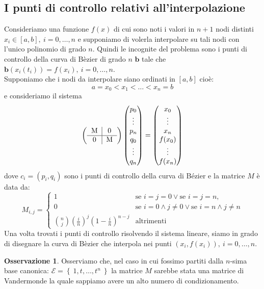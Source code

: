 \documentclass[a4paper,12pt]{report}
\theoremstyle{definition}
\newtheorem{oss}{Osservazione}[chapter]
\begin{document}
\subsection{I punti di controllo relativi all'interpolazione} \label{System}
Consideriamo una funzione $f(x)$ di cui sono noti i valori in $n + 1$ nodi distinti $x_i \in [a,b],\ i = 0, \ldots, n$ e supponiamo di volerla interpolare su tali nodi con l'unico polinomio di grado $n$. Quindi le incognite del problema sono i punti di controllo della curva di Bèzier di grado $n$ $\textbf{b}$ tale che $\textbf{b}(x_i(t_i)) = f(x_i),\ i = 0, \ldots, n$.\\Supponiamo che i nodi da interpolare siano ordinati in $[a,b]$ cioè: $$a = x_0 < x_1 < \ldots < x_n = b$$ e consideriamo il sistema  
$$\left(\begin{matrix}\begin{tabular}{c|c}
M&0\\\hline 0&M
\end{tabular}
\end{matrix}\right)\left(\begin{matrix}
p_0\\\vdots\\p_n\\q_0\\\vdots\\q_n
\end{matrix}\right)=\left(\begin{matrix}
x_0\\\vdots\\x_n\\f(x_0)\\\vdots\\f(x_n)
\end{matrix}\right)$$
dove $c_i=(p_i,q_i) $ sono i punti di controllo della curva di Bézier e la matrice $M$ è data da:
\[M_{i,j} =
	\begin{cases}
	1 & \text{se $i = j = 0$} \vee \text{se $i = j = n$}, \\
	0 & \text{se $i = 0 \wedge j \neq 0$} \vee \text{se $i = n \wedge j \neq n$} \\
	\binom{n}{j} (\frac{i}{n})^j (1-\frac{i}{n})^{n-j} & \text{altrimenti}
	\end{cases}
\]
Una volta trovati i punti di controllo risolvendo il sistema lineare, siamo in grado di disegnare la curva di Bèzier che interpola nei punti $(x_i,f(x_i)),\ i = 0, \ldots, n$.
\begin{oss}
	Osserviamo che, nel caso in cui fossimo partiti dalla $n$-sima base canonica: $\mathcal{E} = \left\{ \ 1,t,\ldots,t^n \ \right\}$ la matrice $M$ sarebbe stata una matrice di Vandermonde la quale sappiamo avere un alto numero di condizionamento.
\end{oss}
\end{document}
